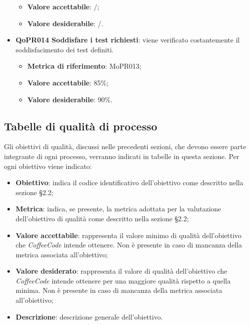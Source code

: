 \documentclass[../piano-di-qualifica.tex]{subfiles}
\begin{document}
\begin{itemize}
\begin{itemize}
            \item \textbf{Valore accettabile}: /; %
            \item \textbf{Valore desiderabile}: /.
        \end{itemize}
    \item \textbf{QoPR014 Soddisfare i test richiesti}: viene verificato costantemente il soddisfacimento dei test definiti.
        \begin{itemize}
            \item \textbf{Metrica di riferimento}: MoPR013;
            \item \textbf{Valore accettabile}: 85\%; %
            \item \textbf{Valore desiderabile}: 90\%.
        \end{itemize}
\end{itemize}

\subsection{Tabelle di qualità di processo}
\label{sub:tabelle_di_qualita_di_processo}
Gli obiettivi di qualità, discussi nelle precedenti sezioni, che devono essere parte integrante di ogni processo, verranno indicati in tabelle in questa sezione.
Per ogni obiettivo viene indicato:

\begin{itemize}
   \item \textbf{Obiettivo}: indica il codice identificativo dell'obiettivo come descritto nella sezione §2.2;
   \item \textbf{Metrica}: indica, se presente, la metrica adottata per la valutazione dell'obiettivo di qualità come descritto nella sezione §2.2;
   \item \textbf{Valore accettabile}: rappresenta il valore minimo di qualità dell'obiettivo che \emph{CoffeeCode} intende ottenere. Non è presente in caso di mancanza della metrica associata all'obiettivo;
   \item \textbf{Valore desiderato}: rappresenta il valore di qualità dell'obiettivo che \emph{CoffeeCode} intende ottenere per una maggiore qualità rispetto a quella minima. Non è presente in caso di mancanza della metrica associata all'obiettivo;
   \item \textbf{Descrizione}: descrizione generale dell'obiettivo.
\end{itemize}
\end{document}
